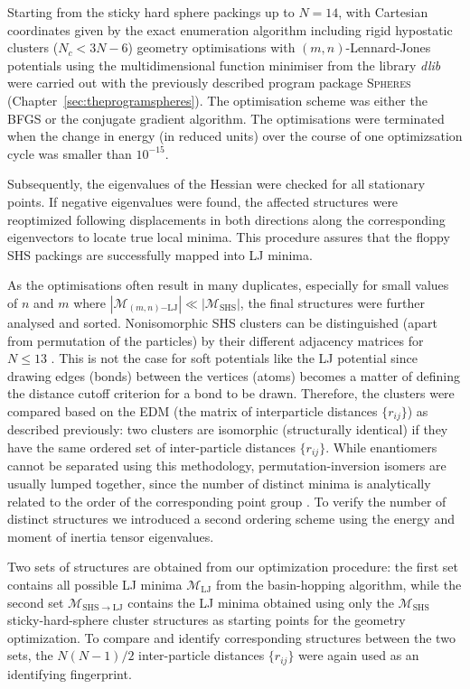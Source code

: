 Starting from the sticky hard sphere packings up to $N=14$, with Cartesian
coordinates given by the exact enumeration algorithm
\autocite{Hoy_Structurefinitesphere_2012} including rigid hypostatic clusters
($N_c<3N-6$) \autocite{Holmes-Cerfon_EnumeratingRigidSphere_2016} geometry
optimisations with $(m,n)$-Lennard-Jones potentials using the multidimensional
function minimiser from the \Cpp library \textit{dlib}
\autocite{King_DlibmlMachineLearning_2009} were carried out with the previously
described program package \textsc{Spheres}
(Chapter~\ref{sec:theprogramspheres}). The optimisation scheme was either the
\ac{BFGS} or the conjugate gradient algorithm. The optimisations were terminated when the
change in energy (in reduced units) over the course of one optimizsation cycle
was smaller than $10^{-15}$. 

Subsequently, the eigenvalues of the Hessian were checked
for all stationary points. If negative eigenvalues were found, the affected
structures were reoptimized following displacements in both directions along
the corresponding eigenvectors to locate true local minima. This procedure assures
that the floppy \ac{SHS} packings are successfully mapped into LJ minima.

As the optimisations often result in many duplicates, especially for small
values of $n$ and $m$ where $|\mathcal{M}_{(m,n)\mathrm{-LJ}}| \ll
|\mathcal{M}_\mathrm{SHS}|$, the final structures were further analysed and
sorted. Nonisomorphic \ac{SHS} clusters can be distinguished (apart from
permutation of the particles) by their different adjacency matrices for $N \leq
13$ \autocite{Holmes-Cerfon_EnumeratingRigidSphere_2016}.  This is not the case
for soft potentials like the LJ potential since drawing edges (bonds) between
the vertices (atoms) becomes a matter of defining the distance cutoff criterion
for a bond to be drawn. Therefore, the clusters were compared based on the
\ac{EDM} (the matrix of interparticle distances $\{r_{ij}\}$) as described
previously: two clusters are isomorphic (structurally identical) if they have
the same ordered set of inter-particle distances $\{r_{ij}\}$.  While
enantiomers cannot be separated using this methodology, permutation-inversion
isomers are usually lumped together, since the number of distinct minima is
analytically related to the order of the corresponding point group
\autocite{wales04}.  To verify the number of distinct structures we introduced
a second ordering scheme using the energy and moment of inertia tensor
eigenvalues. 

Two sets of structures are obtained from our optimization procedure: the first
set contains all possible LJ minima $\mathcal{M}_\mathrm{LJ}$ from the
basin-hopping algorithm, while the second set $\mathcal{M}_\mathrm{SHS\to LJ}$
contains the LJ minima obtained using only the $\mathcal{M}_\mathrm{SHS}$
sticky-hard-sphere cluster structures as starting points for the geometry
optimization.  To compare and identify corresponding structures between the two
sets, the $N(N-1)/2$ inter-particle distances $\{r_{ij}\}$ were again used as
an identifying fingerprint.

